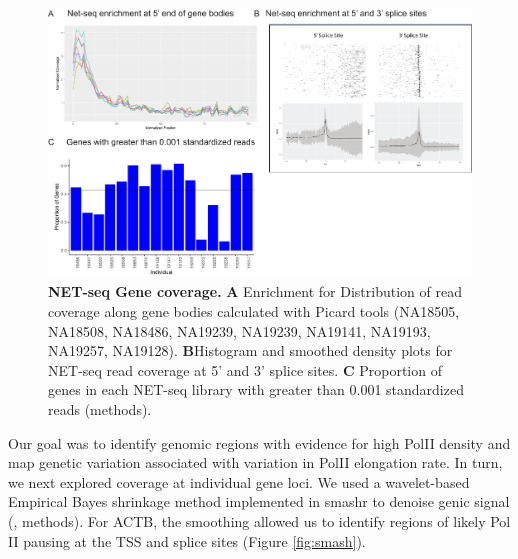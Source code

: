 \begin{figure}
\centering \includegraphics[trim=0 .3in 0
  0,clip,width=5in]{img/ch04/Figure3.pdf}
\caption[NET-seq Gene coverage.]{\textbf{NET-seq Gene coverage.} {\bf A} Enrichment for Distribution of read coverage along gene bodies calculated with Picard tools (NA18505, NA18508, NA18486, NA19239, NA19239, NA19141, NA19193, NA19257, NA19128). {\bf B}Histogram and smoothed density plots for NET-seq read coverage at 5' and 3' splice sites. {\bf C} Proportion of genes in each NET-seq library with greater than 0.001 standardized reads (methods).}
\label{fig:genecov}
\end{figure}


Our goal was to identify genomic regions with evidence for high PolII density and map genetic variation associated with variation in PolII elongation rate. In turn, we next explored coverage at individual gene loci. We used a wavelet-based Empirical Bayes shrinkage method implemented in smashr to denoise genic signal (\citep{xing_flexible_2016}, methods). For ACTB, the smoothing allowed us to identify regions of likely Pol II pausing at the TSS and splice sites (Figure \ref{fig:smash}). 



